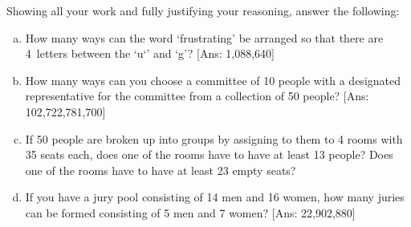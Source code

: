 \documentclass[11pt,letterpaper]{article}
\begin{document}
\newpage



 Showing all your work and fully justifying your reasoning, answer the following:
	\begin{enumerate}[(a)]
	\item How many ways can the word `frustrating' be arranged so that there are 4~letters between the `u`' and `g'? [Ans: 1,088,640]
	\item How many ways can you choose a committee of 10 people with a designated representative for the committee from a collection of 50 people? [Ans: 102,722,781,700]
	\item If 50 people are broken up into groups by assigning to them to 4 rooms with 35 seats each, does one of the rooms have to have at least 13 people? Does one of the rooms have to have at least 23 empty seats?
	\item If you have a jury pool consisting of 14 men and 16 women, how many juries can be formed consisting of 5 men and 7 women? [Ans: 22,902,880]
	\end{enumerate}
\end{document}
